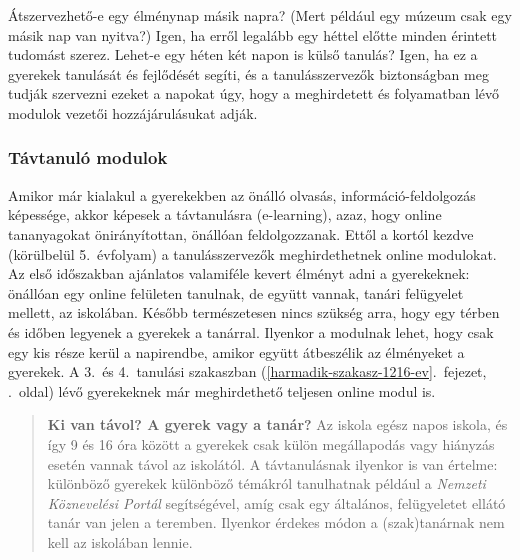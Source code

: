 Átszervezhető-e egy élménynap másik napra? (Mert például egy múzeum csak
egy másik nap van nyitva?) Igen, ha erről legalább egy héttel előtte
minden érintett tudomást szerez. Lehet-e egy héten két napon is külső
tanulás? Igen, ha ez a gyerekek tanulását és fejlődését segíti, és a
tanulásszervezők biztonságban meg tudják szervezni ezeket a napokat úgy,
hogy a meghirdetett és folyamatban lévő modulok vezetői hozzájárulásukat
adják.

\hypertarget{tavtanulo-modulok}{%
\subsubsection{Távtanuló modulok}\label{tavtanulo-modulok}}

Amikor már kialakul a gyerekekben az önálló olvasás,
információ-fel\-dol\-go\-zás képessége, akkor képesek a távtanulásra
(e-learning), azaz, hogy online tananyagokat önirányítottan, önállóan
feldolgozzanak. Ettől a kortól kezdve (körülbelül 5.\ évfolyam)
a tanulásszervezők meghirdethetnek online modulokat. Az első időszakban
ajánlatos valamiféle kevert élményt adni a gyerekeknek: önállóan egy
online felületen tanulnak, de együtt vannak, tanári felügyelet mellett,
az iskolában. Később természetesen nincs szükség arra, hogy egy térben
és időben legyenek a gyerekek a tanárral. Ilyenkor a modulnak lehet,
hogy csak egy kis része kerül a napirendbe, amikor együtt átbeszélik az
élményeket a gyerekek. A
3.\ és 4.\ tanulási szakaszban (\ref{harmadik-szakasz-1216-ev}.~fejezet, \pageref{harmadik-szakasz-1216-ev}.~oldal)
lévő gyerekeknek már meghirdethető teljesen online modul is.

\begin{quote}
\textbf{Ki van távol? A gyerek vagy a tanár?} Az iskola egész napos
iskola, és így 9 és 16 óra között a gyerekek csak külön megállapodás vagy
hiányzás esetén vannak távol az iskolától. A távtanulásnak ilyenkor is
van értelme: különböző gyerekek különböző témákról tanulhatnak például
a %
{\emph{Nemzeti Köznevelési Portál}}
segítségével, amíg csak egy általános, felügyeletet ellátó tanár van
jelen a teremben. Ilyenkor érdekes módon a (szak)tanárnak nem kell az
iskolában lennie.
\end{quote}
